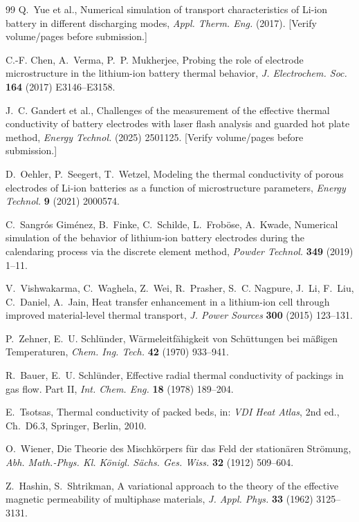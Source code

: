 \documentclass[10pt,a4paper]{article}
\begin{document}
\begin{thebibliography}{99}
Q.~Yue et al.,
Numerical simulation of transport characteristics of Li-ion battery in different discharging modes,
\emph{Appl. Therm. Eng.} (2017). [Verify volume/pages before submission.]

C.-F. Chen, A.~Verma, P.~P. Mukherjee,
Probing the role of electrode microstructure in the lithium-ion battery thermal behavior,
\emph{J. Electrochem. Soc.} \textbf{164} (2017) E3146--E3158.

J.~C. Gandert et al.,
Challenges of the measurement of the effective thermal conductivity of battery electrodes with laser flash analysis and guarded hot plate method,
\emph{Energy Technol.} (2025) 2501125. [Verify volume/pages before submission.]

D.~Oehler, P.~Seegert, T.~Wetzel,
Modeling the thermal conductivity of porous electrodes of Li-ion batteries as a function of microstructure parameters,
\emph{Energy Technol.} \textbf{9} (2021) 2000574.

C.~Sangr\'os Gim\'enez, B.~Finke, C.~Schilde, L.~Frob\"ose, A.~Kwade,
Numerical simulation of the behavior of lithium-ion battery electrodes during the calendaring process via the discrete element method,
\emph{Powder Technol.} \textbf{349} (2019) 1--11.

V.~Vishwakarma, C.~Waghela, Z.~Wei, R.~Prasher, S.~C. Nagpure, J.~Li, F.~Liu, C.~Daniel, A.~Jain,
Heat transfer enhancement in a lithium-ion cell through improved material-level thermal transport,
\emph{J. Power Sources} \textbf{300} (2015) 123--131.

P.~Zehner, E.~U. Schl\"under,
W\"armeleitf\"ahigkeit von Sch\"uttungen bei m\"a\ss{}igen Temperaturen,
\emph{Chem. Ing. Tech.} \textbf{42} (1970) 933--941.

R.~Bauer, E.~U. Schl\"under,
Effective radial thermal conductivity of packings in gas flow. Part II,
\emph{Int. Chem. Eng.} \textbf{18} (1978) 189--204.

E.~Tsotsas,
Thermal conductivity of packed beds,
in: \emph{VDI Heat Atlas}, 2nd ed., Ch.~D6.3, Springer, Berlin, 2010.

O.~Wiener,
Die Theorie des Mischk\"orpers f\"ur das Feld der station\"aren Str\"omung,
\emph{Abh. Math.-Phys. Kl. K\"onigl. S\"achs. Ges. Wiss.} \textbf{32} (1912) 509--604.

Z.~Hashin, S.~Shtrikman,
A variational approach to the theory of the effective magnetic permeability of multiphase materials,
\emph{J. Appl. Phys.} \textbf{33} (1962) 3125--3131.


\end{thebibliography}
\end{document}
